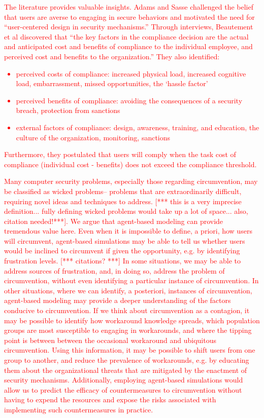 \documentclass{acm_proc_article-sp}
\begin{document}
\textcolor{red}{The literature provides valuable insights. Adams and Sasse 
\cite{adams1999users} challenged the belief that users 
are averse to engaging in secure behaviors and motivated the need for 
``user-centered design in security mechanisms.'' 
Through interviews, Beautement et al  \cite{beautement2009compliance} discovered that ``the key factors in 
the compliance decision are the actual and anticipated cost and benefits of 
compliance to the individual employee, and perceived cost and benefits to 
the organization.'' They also identified:
\begin{itemize}
\item perceived costs of compliance: increased physical load, increased cognitive load, embarrassment, missed opportunities, the `hassle factor'
\item perceived benefits of compliance: avoiding the consequences of a security breach, protection from sanctions
\item external factors of compliance: design, awareness, training, and education, the culture of the organization, monitoring, sanctions
\end{itemize}
Furthermore, they postulated that users will comply when the task cost of 
compliance (individual cost - benefits) does not exceed the compliance threshold.
}

\textcolor{red}{Many computer security problems, especially those regarding 
circumvention, may be classified as wicked problems-- problems that are 
extraordinarily difficult, requiring novel ideas and techniques to 
address. [*** this is a very imprecise definition... fully defining 
wicked problems would take up a lot of space... also, citation needed!***]. 
We argue that agent-based modeling can provide tremendous value here. 
Even when it is impossible to define, a priori, how users will circumvent, 
agent-based simulations may be able to tell us whether users would be 
inclined to circumvent if given the opportunity, e.g. by identifying frustration levels.
[*** citations? ***] 
In some situations, we may be able to address sources of frustration, 
and, in doing so, address the problem of circumvention, without even identifying a 
particular instance of circumvention. In other situations, where we can identify, a posteriori, 
instances of circumvention, agent-based modeling may provide a deeper 
understanding of the factors conducive to circumvention. If we 
think about circumvention as a contagion, it may be possible to identify how workaround
knowledge spreads, which population groups are most susceptible to engaging in workarounds, 
and where the tipping point is between between the occasional workaround and ubiquitous circumvention. 
Using this information, it may be possible to shift users from one group to another, and 
reduce the prevalence of workarounds, e.g. by educating them about the 
organizational threats that are mitigated by the enactment of security mechanisms.
Additionally, employing agent-based simulations would allow us to predict 
the efficacy of countermeasures to circumvention without having to expend the resources 
and expose the risks associated with implementing such countermeasures in practice.}
\end{document}
